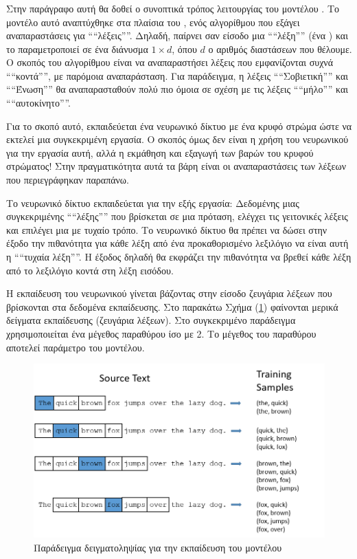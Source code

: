 \subsubsection{} \label{SkipGram}

Στην παράγραφο αυτή θα δοθεί ο συνοπτικά τρόπος λειτουργίας του μοντέλου . Το
μοντέλο αυτό αναπτύχθηκε στα πλαίσια του , ενός αλγορίθμου που εξάγει
αναπαραστάσεις για ````λέξεις''''. Δηλαδή, παίρνει σαν είσοδο μια ````λέξη'''' (ένα ) και το
παραμετροποιεί σε ένα διάνυσμα \(1 \times d\), όπου \(d\) ο αριθμός διαστάσεων που θέλουμε.
Ο σκοπός του αλγορίθμου είναι να αναπαραστήσει λέξεις που εμφανίζονται συχνά ````κοντά'''',
με παρόμοια αναπαράσταση. Για παράδειγμα, η λέξεις ````Σοβιετική'''' και ````Ένωση'''' θα αναπαρασταθούν
πολύ πιο όμοια σε σχέση με τις λέξεις ````μήλο'''' και ````αυτοκίνητο''''.

Για το σκοπό αυτό, εκπαιδεύεται ένα νευρωνικό δίκτυο με ένα κρυφό στρώμα ώστε να εκτελεί
μια συγκεκριμένη εργασία. Ο σκοπός όμως δεν είναι η χρήση του νευρωνικού για την εργασία
αυτή, αλλά η εκμάθηση και εξαγωγή των βαρών του κρυφού στρώματος! Στην πραγματικότητα
αυτά τα βάρη είναι οι αναπαραστάσεις των λέξεων που περιεγράφηκαν παραπάνω.

Το νευρωνικό δίκτυο εκπαιδεύεται για την εξής εργασία: Δεδομένης μιας συγκεκριμένης ````λέξης''''
που βρίσκεται σε μια πρόταση, ελέγχει τις γειτονικές λέξεις και επιλέγει μια
με τυχαίο τρόπο. Το νευρωνικό δίκτυο θα πρέπει να δώσει στην έξοδο την πιθανότητα για
κάθε λέξη από ένα προκαθορισμένο λεξιλόγιο να είναι αυτή η ````τυχαία λέξη''''. Η έξοδος δηλαδή 
θα εκφράζει την πιθανότητα να βρεθεί κάθε λέξη από το λεξιλόγιο κοντά στη λέξη εισόδου.

Η εκπαίδευση του νευρωνικού γίνεται βάζοντας στην είσοδο ζευγάρια λέξεων που βρίσκονται
στα δεδομένα εκπαίδευσης. Στο παρακάτω  Σχήμα (\ref{figure1.2}) φαίνονται μερικά 
δείγματα εκπαίδευσης (ζευγάρια λέξεων). Στο συγκεκριμένο παράδειγμα χρησιμοποιείται ένα μέγεθος 
παραθύρου ίσο με 2. Το μέγεθος του παραθύρου αποτελεί παράμετρο του μοντέλου.

\begin{figure}[!ht] \centering
\includegraphics[scale = 0.45]{static/figures/skipgram_sample.png} 
\caption{Παράδειγμα δειγματοληψίας για την εκπαίδευση του μοντέλου  \cite{word2vec}}
\label{figure1.2}
\end{figure}


